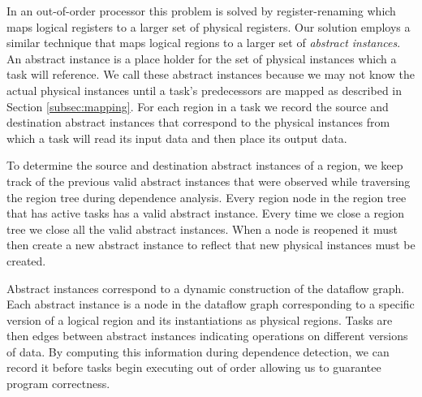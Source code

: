 
In an out-of-order processor this problem is solved by register-renaming which maps logical
registers to a larger set of physical registers.  Our solution employs a similar technique
that maps logical regions to a larger set of {\em abstract instances}.  An abstract instance
is a place holder for the set of physical instances which a task will reference.  We call these
abstract instances because we may not know the actual physical instances until a task's predecessors
are mapped as described in Section \ref{subsec:mapping}.  For each region in
a task we record the source and destination abstract instances that correspond to the physical
instances from which a task will read its input data and then place its output data.

To determine the source and destination abstract instances of a region, we keep track of 
the previous valid abstract instances that were observed while traversing the region tree
during dependence analysis.  Every region node in the region tree that has active tasks
has a valid abstract instance.  Every time we close a region tree we close all the valid
abstract instances.  When a node is reopened it must then create a new abstract instance
to reflect that new physical instances must be created.

Abstract instances correspond to a dynamic construction of the dataflow graph.  Each abstract
instance is a node in the dataflow graph corresponding to a specific version of a logical 
region and its instantiations as physical regions.  Tasks are then edges between abstract
instances indicating operations on different versions of data.  By computing this information
during dependence detection, we can record it before tasks begin executing out of order allowing
us to guarantee program correctness.  

